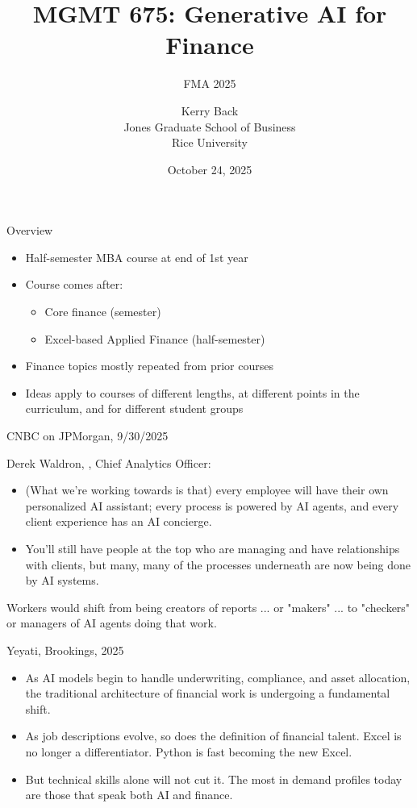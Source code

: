 \documentclass{beamer}
\title{MGMT 675: Generative AI for Finance}
\subtitle{FMA 2025}
\date{October 24, 2025}
\author{Kerry Back\\ 
Jones Graduate School of Business\\
Rice University}
\begin{document}
\maketitle


\begin{frame}{Overview}
    \begin{itemize}
    \item Half-semester MBA course at end of 1st year
    \item Course comes after: 
    \begin{itemize}
    \item Core finance (semester) 
    \item Excel-based Applied Finance (half-semester)
    \end{itemize}
    \item Finance topics mostly repeated from prior courses
    \item Ideas apply to courses of different lengths, at different points in the curriculum, and for different student groups
    \end{itemize}

\end{frame}


\begin{frame}{CNBC on JPMorgan, 9/30/2025}

Derek Waldron, , Chief Analytics Officer:
\begin{itemize}
\item (What we're working towards is that) every employee will have their own personalized AI assistant; every process is powered by AI agents, and every client experience has an AI concierge.
\item You'll still have people at the top who are managing and have relationships with clients, but many, many of the processes underneath are now being done by AI systems.
\end{itemize}


Workers would shift from being creators of reports ... or "makers" ... to "checkers" or managers of AI agents doing that work.

\end{frame}

\begin{frame}{Yeyati, Brookings, 2025}

\begin{itemize}
\item As AI models begin to handle underwriting, compliance, and asset allocation, the traditional architecture of financial work is undergoing a fundamental shift.
\item As job descriptions evolve, so does the definition of financial talent. Excel is no longer a differentiator. Python is fast becoming the new Excel. 
\item But technical skills alone will not cut it. The most in demand profiles today are those that speak both AI and finance.
\end{itemize}
\end{frame}
\end{document}
